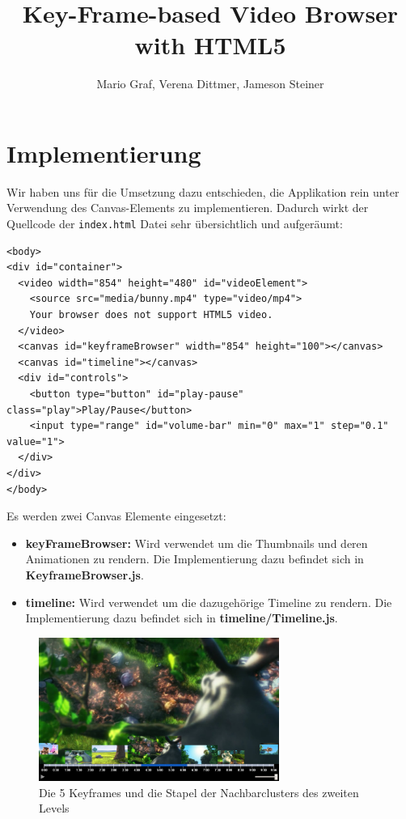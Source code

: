 \documentclass[a4paper,11pt,german]{scrartcl}
\title{Key-Frame-based Video Browser with HTML5}
\author{Mario Graf, Verena Dittmer, Jameson Steiner}
\providecommand{\tightlist}{%
  \setlength{\itemsep}{0pt}\setlength{\parskip}{0pt}}
\begin{document}
\maketitle

\section*{Implementierung}
Wir haben uns für die Umsetzung dazu entschieden, die Applikation rein unter Verwendung des Canvas-Elements zu implementieren. Dadurch wirkt der Quellcode der \lstinline$index.html$ Datei sehr übersichtlich und aufgeräumt:

\begin{verbatim}
<body>
<div id="container">
  <video width="854" height="480" id="videoElement">
    <source src="media/bunny.mp4" type="video/mp4">
    Your browser does not support HTML5 video.
  </video>
  <canvas id="keyframeBrowser" width="854" height="100"></canvas>
  <canvas id="timeline"></canvas>
  <div id="controls">
    <button type="button" id="play-pause" class="play">Play/Pause</button>
    <input type="range" id="volume-bar" min="0" max="1" step="0.1" value="1">
  </div>
</div>
</body>
\end{verbatim}

Es werden zwei Canvas Elemente eingesetzt:
\begin{itemize}
\tightlist
\item \textbf{keyFrameBrowser: } Wird verwendet um die Thumbnails und deren Animationen zu rendern. Die Implementierung dazu befindet sich in \textbf{KeyframeBrowser.js}.
\item \textbf{timeline: } Wird verwendet um die dazugehörige Timeline zu rendern. Die Implementierung dazu befindet sich in \textbf{timeline/Timeline.js}.
\end{itemize}

\begin{figure}[ht!]
	\centering
  	\includegraphics[width=0.7\textwidth]{images/videoBrowserZoomIn.png}
	\caption{Die 5 Keyframes und die Stapel der Nachbarclusters des zweiten Levels}
	\label{zoomedIn}
\end{figure}
\end{document}
